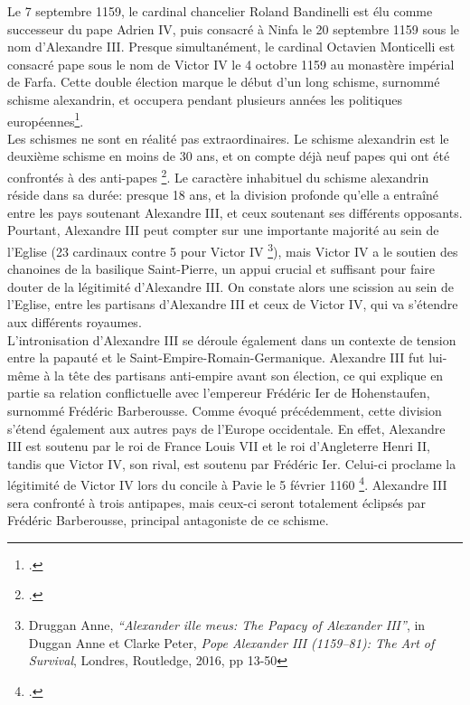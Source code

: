 Le 7 septembre 1159, le cardinal chancelier Roland Bandinelli est élu comme successeur du pape Adrien IV, puis consacré à Ninfa le 20 septembre 1159 sous le nom d’Alexandre III. Presque simultanément, le cardinal Octavien Monticelli est consacré pape sous le nom de Victor IV le 4 octobre 1159 au monastère impérial de Farfa. Cette double élection marque le début d’un long schisme, surnommé schisme alexandrin, et occupera pendant plusieurs années les politiques européennes\footcite{maclean_recycling_2012}.\\ 
Les schismes ne sont en réalité pas extraordinaires. Le schisme alexandrin est le deuxième schisme en moins de 30 ans, et on compte déjà neuf papes qui ont été confrontés à des anti-papes \footcite{soria_propagande_2007}. Le caractère inhabituel du schisme alexandrin réside dans sa durée: presque 18 ans, et la division profonde qu’elle a entraîné entre les pays soutenant Alexandre III, et ceux soutenant ses différents opposants. Pourtant, Alexandre III peut compter sur une importante majorité au sein de l’Eglise (23 cardinaux contre 5 pour Victor IV \footnote{Druggan Anne, \textit{“Alexander ille meus: The Papacy of Alexander III”}, in Duggan Anne et Clarke Peter, \textit{Pope Alexander III (1159–81): The Art of Survival}, Londres, Routledge, 2016, pp 13-50}), mais Victor IV a le soutien des chanoines de la basilique Saint-Pierre, un appui crucial et suffisant pour faire douter de la légitimité d’Alexandre III. On constate alors une scission au sein de l’Eglise, entre les partisans d’Alexandre III et ceux de Victor IV, qui va s’étendre aux différents royaumes.\\ 
L’intronisation d’Alexandre III se déroule également dans un contexte de tension entre la papauté et le Saint-Empire-Romain-Germanique. Alexandre III fut lui-même à la tête des partisans anti-empire avant son élection, ce qui explique en partie sa relation conflictuelle avec l’empereur Frédéric Ier de Hohenstaufen, surnommé Frédéric Barberousse. Comme évoqué précédemment, cette division s’étend également aux autres pays de l’Europe occidentale. En effet, Alexandre III est soutenu par le roi de France Louis VII et le roi d’Angleterre Henri II, tandis que Victor IV, son rival, est soutenu par Frédéric Ier. Celui-ci proclame la légitimité de Victor IV lors du concile à Pavie le 5 février 1160 \footcite{soria_propagande_2007.}. Alexandre III sera confronté à trois antipapes, mais ceux-ci seront totalement éclipsés par Frédéric Barberousse, principal antagoniste de ce schisme.


